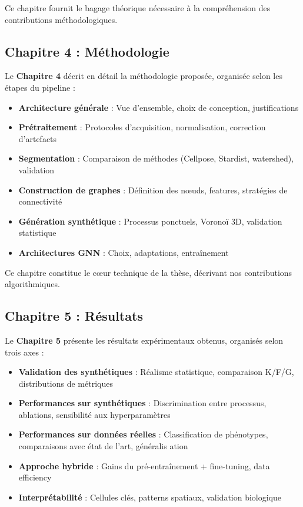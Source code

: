 Ce chapitre fournit le bagage théorique nécessaire à la compréhension des contributions méthodologiques.

\subsection{Chapitre 4 : Méthodologie}

Le \textbf{Chapitre 4} décrit en détail la méthodologie proposée, organisée selon les étapes du pipeline :
\begin{itemize}
    \item \textbf{Architecture générale} : Vue d'ensemble, choix de conception, justifications
    \item \textbf{Prétraitement} : Protocoles d'acquisition, normalisation, correction d'artefacts
    \item \textbf{Segmentation} : Comparaison de méthodes (Cellpose, Stardist, watershed), validation
    \item \textbf{Construction de graphes} : Définition des nœuds, features, stratégies de connectivité
    \item \textbf{Génération synthétique} : Processus ponctuels, Voronoï 3D, validation statistique
    \item \textbf{Architectures GNN} : Choix, adaptations, entraînement
\end{itemize}

Ce chapitre constitue le cœur technique de la thèse, décrivant nos contributions algorithmiques.

\subsection{Chapitre 5 : Résultats}

Le \textbf{Chapitre 5} présente les résultats expérimentaux obtenus, organisés selon trois axes :
\begin{itemize}
    \item \textbf{Validation des synthétiques} : Réalisme statistique, comparaison K/F/G, distributions de métriques
    \item \textbf{Performances sur synthétiques} : Discrimination entre processus, ablations, sensibilité aux hyperparamètres
    \item \textbf{Performances sur données réelles} : Classification de phénotypes, comparaisons avec état de l'art, généralis ation
    \item \textbf{Approche hybride} : Gains du pré-entraînement + fine-tuning, data efficiency
    \item \textbf{Interprétabilité} : Cellules clés, patterns spatiaux, validation biologique
\end{itemize}


